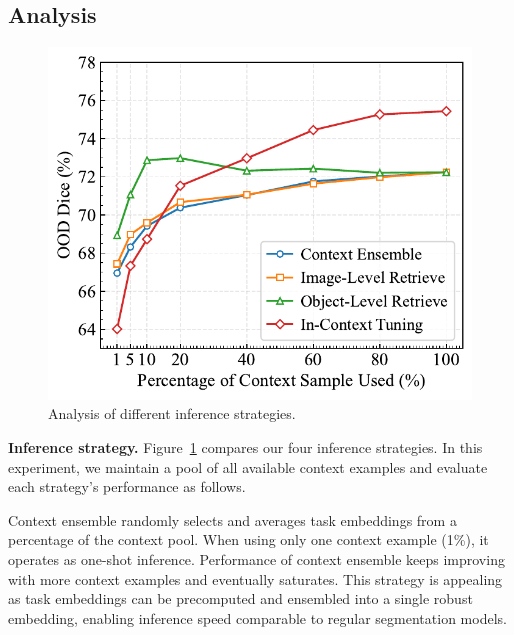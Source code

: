 \subsection{Analysis}


\begin{figure}[t]
\begin{center}
\includegraphics[width=0.7\columnwidth]{./fig/inference_comparison.pdf}
\end{center}
\vspace{-1em}
\caption{Analysis of different inference strategies.}
\label{fig:inference_comparison}
\vspace{-1em}
\end{figure}

\noindent\textbf{Inference strategy.} Figure~\ref{fig:inference_comparison} compares our four inference strategies. In this experiment, we maintain a pool of all available context examples and evaluate each strategy's performance as follows.

Context ensemble randomly selects and averages task embeddings from a percentage of the context pool. When using only one context example (1\%), it operates as one-shot inference. Performance of context ensemble keeps improving with more context examples and eventually saturates. This strategy is appealing as task embeddings can be precomputed and ensembled into a single robust embedding, enabling inference speed comparable to regular segmentation models.


